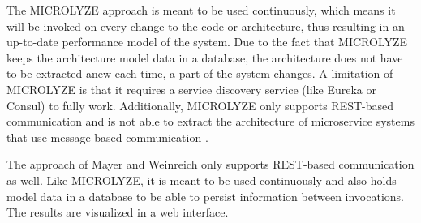 The MICROLYZE approach is meant to be used continuously, which means it will be invoked on every change to the code or architecture, thus resulting in an up-to-date performance model of the system.
Due to the fact that MICROLYZE keeps the architecture model data in a database, the architecture does not have to be extracted anew each time, a part of the system changes.
A limitation of MICROLYZE is that it requires a service discovery service (like Eureka or Consul) to fully work.
Additionally, MICROLYZE only supports REST-based communication and is not able to extract the architecture of microservice systems that use message-based communication \cite{Kleehaus2018}.

The approach of Mayer and Weinreich only supports REST-based communication as well.
Like MICROLYZE, it is meant to be used continuously and also holds model data in a database to be able to persist information between invocations.
The results are visualized in a web interface.

